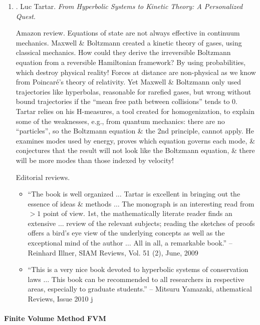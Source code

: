 \documentclass{article}
\begin{document}
\begin{enumerate}
	\item \cite{Tartar2008}. {\sc Luc Tartar}. {\it From Hyperbolic Systems to Kinetic Theory: A Personalized Quest}.

	{\sf Amazon review.} Equations of state are not always effective in continuum mechanics. {\sc Maxwell \& Boltzmann} created a kinetic theory of gases, using classical mechanics. How could they derive the irreversible Boltzmann equation from a reversible Hamiltonian framework? By using probabilities, which destroy physical reality! Forces at distance are non-physical as we know from {\sc Poincar\'e}'s theory of relativity. Yet {\sc Maxwell \& Boltzmann} only used trajectories like hyperbolas, reasonable for rarefied gases, but wrong without bound trajectories if the ``mean free path between collisions'' tends to 0. {\sc Tartar} relies on his H-measures, a tool created for homogenization, to explain some of the weaknesses, e.g., from quantum mechanics: there are no ``particles'', so the Boltzmann equation \& the 2nd principle, cannot apply. He examines modes used by energy, proves which equation governs each mode, \& conjectures that the result will not look like the Boltzmann equation, \& there will be more modes than those indexed by velocity!

	{\sf Editorial reviews.}
	\begin{itemize}
		\item ``The book is well organized $\ldots$ {\sc Tartar} is excellent in bringing out the essence of ideas \& methods $\ldots$ The monograph is an interesting read from $> 1$ point of view. 1st, the mathematically literate reader finds an extensive $\ldots$ review of the relevant subjects; reading the sketches of proofs offers a bird's eye view of the underlying concepts as well as the exceptional mind of the author $\ldots$ All in all, a remarkable book.'' -- {\sc Reinhard Illner}, SIAM Reviews, Vol. 51 (2), June, 2009
		\item ``This is a very nice book devoted to hyperbolic systems of conservation laws $\ldots$ This book can be recommended to all researchers in respective areas, especially to graduate students.'' -- {\sc Mitsuru Yamazaki}, athematical Reviews, Issue 2010 j
	\end{itemize}
\end{enumerate}

\paragraph{Finite Volume Method FVM}
\end{document}
